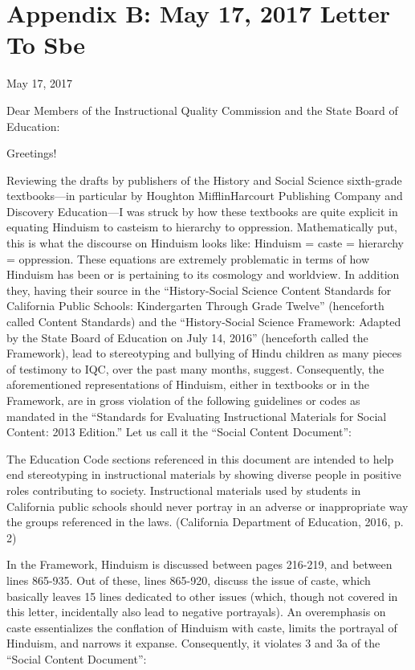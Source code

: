 \chapter{Appendix B: May 17, 2017 Letter To Sbe}

May 17, 2017

Dear Members of the Instructional Quality Commission and the State Board of Education:

Greetings!

Reviewing the drafts by publishers of the History and Social Science sixth-grade textbooks—in particular by Houghton MifflinHarcourt Publishing Company and Discovery Education—I was struck by how these textbooks are quite explicit in equating Hinduism to casteism to hierarchy to oppression. Mathematically put, this is what the discourse on Hinduism looks like: Hinduism = caste = hierarchy = oppression. These equations are extremely problematic in terms of how Hinduism has been or is pertaining to its cosmology and worldview. In addition they, having their source in the “History-Social Science Content Standards for California Public Schools: Kindergarten Through Grade Twelve” (henceforth called Content Standards) and the “History-Social Science Framework: Adapted by the State Board of Education on July 14, 2016” (henceforth called the Framework), lead to stereotyping and bullying of Hindu children as many pieces of testimony to IQC, over the past many months, suggest. Consequently, the aforementioned representations of Hinduism, either in textbooks or in the Framework, are in gross violation of the following guidelines or codes as mandated in the “Standards for Evaluating Instructional Materials for Social Content: 2013 Edition.” Let us call it the “Social Content Document”: 

The Education Code sections referenced in this document are intended to help end stereotyping in instructional materials by showing diverse people in positive roles contributing to society. Instructional materials used by students in California public schools should never portray in an adverse or inappropriate way the groups referenced in the laws. (California Department of Education, 2016, p. 2)

In the Framework, Hinduism is discussed between pages 216-219, and between lines 865-935. Out of these, lines 865-920, discuss the issue of caste, which basically leaves 15 lines dedicated to other issues (which, though not covered in this letter, incidentally also lead to negative portrayals). An overemphasis on caste essentializes the conflation of Hinduism with caste, limits the portrayal of Hinduism, and narrows it expanse. Consequently, it violates 3 and 3a of the “Social Content Document”:

